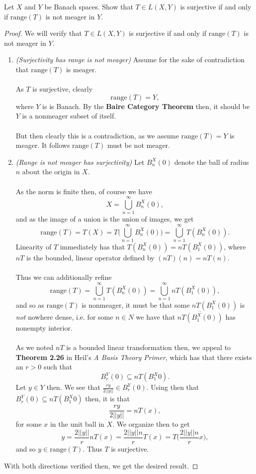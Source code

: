\documentclass[12pt]{article}
\newenvironment{ex}[2][Exercise]{\begin{trivlist}
\item[\hskip \labelsep {\bfseries #1}\hskip \labelsep {\bfseries #2.}]}{\end{trivlist}}
\begin{document}
\begin{ex}{2}
    Let $X$ and $Y$ be Banach spaces. Show that $T \in L(X,Y)$ is surjective if and only if $\text{range}(T)$ is not meager in $Y$. 
    \begin{proof}
        We will verify that $T \in L(X,Y)$ is surjective if and only if $\text{range}(T)$ is not meager in $Y$.
        \begin{enumerate}[label=(\roman*)]
            \item \textit{(Surjectivity has range is not meager)} Assume for the sake of contradiction that $\text{range}(T)$ is meager.  \\ \\
            As $T$ is surjective, clearly 
            $$\text{range}(T) = Y,$$
            where $Y$ is is Banach. By the \textbf{Baire Category Theorem} then, it should be $Y$ is a nonmeager subset of itself. \\ \\
            But then clearly this is a contradiction, as we assume $\text{range}(T) = Y$ is meager. It follows $\text{range}(T)$ must be not meager.
            \item \textit{(Range is not meager has surjectivity)} 
            Let $B_n^X(0)$ denote the ball of radius $n$ about the origin in $X$.  \\ \\
            As the norm is finite then, of course we have 
            $$X = \bigcup_{n = 1}^\infty B_n^X(0),$$
            and as the image of a union is the union of images, we get 
            $$\text{range}{(T)} = T(X) = T \Big (\bigcup_{n = 1}^\infty B_n^X(0) \Big) = \bigcup_{n = 1}^\infty T(B_n^X(0)).$$
            Linearity of $T$ immediately has that $T(B_n^X(0)) = nT(B_1^X(0))$, where $nT$ is the bounded, linear operator defined by $(nT)(n) = nT(n)$. \\ \\
            Thus we can additionally refine 
            $$\text{range}{(T)} = \bigcup_{n = 1}^\infty T(B_n^X(0)) = \bigcup_{n = 1}^\infty nT(B_1^X(0)),$$
            and so as $\text{range}(T)$ is nonmeager, it must be that some $nT(B_1^X(0))$ is \textit{not} nowhere dense, i.e. for some $n \in N$ we have that $\overline{nT(B_1^X(0))}$ has nonempty interior. \\ \\
            As we noted $nT$ is a bounded linear transformation then, we appeal to \textbf{Theorem 2.26} in Heil's \textit{A Basis Theory Primer}, which has that there exists an $r > 0$ such that 
            $$B_r^Y(0) \subseteq nT(B_1^X{0}).$$
            Let $y \in Y$ then. We see that $\frac{ry}{2||y||} \in B_r^Y(0)$. Using then that $B_r^Y(0) \subseteq nT(B_1^X{0})$ then, it is that 
            $$\frac{ry}{2||y||} = nT(x),$$
            for some $x$ in the unit ball in $X$. We organize then to get 
            $$y = \frac{2||y||}{r}nT(x) = \frac{2||y||n}{r}T(x) = T \Big (\frac{2||y||n}{r}x \Big),$$
            and so $y \in \text{range}(T)$. Thus $T$ is surjective.
        \end{enumerate}
        With both directions verified then, we get the desired result.
    \end{proof}
\end{ex}
\end{document}
